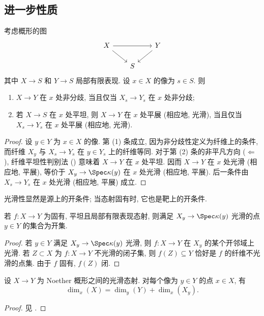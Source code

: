 \subsection{进一步性质}\label{src:A.3.3-subsection}
\begin{proposition}\label{src:A.3.8}
考虑概形的图
\[
\begin{tikzcd}[column sep=2em,row sep=1.5em]
X\arrow[rr]\arrow[dr]&&Y\arrow[dl]\\&S&
\end{tikzcd}
\]
其中 $X\to S$ 和 $Y\to S$ 局部有限表现. 设 $x\in X$ 的像为 $s\in S$. 则
\begin{enumerate}[(1)]
\item $X\to Y$ 在 $x$ 处非分歧, 当且仅当 $X_s\to Y_s$ 在 $x$ 处非分歧;
\item 若 $X\to S$ 在 $x$ 处平坦, 则 $X\to Y$ 在 $x$ 处平展 (相应地, 光滑), 当且仅当 $X_s\to Y_s$ 在 $x$ 处平展 (相应地, 光滑).
\end{enumerate}
\end{proposition}
\begin{proof}
设 $y\in Y$ 为 $x\in X$ 的像. 第 (1) 条成立, 因为非分歧性定义为纤维上的条件, 而纤维 $X_y$ 与 $X_s\to Y_s$ 在 $y\in Y_s$ 上的纤维等同. 对于第 (2) 条的非平凡方向 ($\Leftarrow$), 纤维平坦性判别法 () 意味着 $X\to Y$ 在 $x$ 处平坦. 因而 $X\to Y$ 在 $x$ 处光滑 (相应地, 平展), 等价于 $X_y\to\Spec\kappa(y)$ 在 $x$ 处光滑 (相应地, 平展). 后一条件由 $X_s\to Y_s$ 在 $x$ 处光滑 (相应地, 平展) 成立.
\end{proof}
光滑性显然是源上的开条件; 当态射固有时, 它也是靶上的开条件.
\begin{corollary}\label{src:A.3.9}
若 $f:X\to Y$ 为固有, 平坦且局部有限表现态射, 则满足 $X_y\to\Spec\kappa(y)$ 光滑的点 $y\in Y$ 的集合为开集.
\end{corollary}
\begin{proof}
若 $y\in Y$ 满足 $X_y\to\Spec\kappa(y)$ 光滑, 则 $f:X\to Y$ 在 $X_y$ 的某个开邻域上光滑. 若 $Z\subset X$ 为 $f:X\to Y$ 不光滑的闭子集, 则 $f(Z)\subseteq Y$ 恰好是 $f$ 的纤维不光滑的点集. 由于 $f$ 固有, $f(Z)$ 闭.
\end{proof}
\begin{proposition}\label{src:A.3.10}
设 $X\to Y$ 为 Noether 概形之间的光滑态射. 对每个像为 $y\in Y$ 的点 $x\in X$, 有
\[
\dim_x(X)=\dim_y(Y)+\dim_x(X_y).
\]
\end{proposition}
\begin{proof}
见 \cite[Tag 0AFF]{SP}.
\end{proof}
